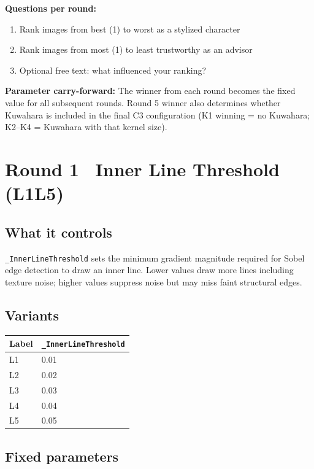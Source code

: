 \documentclass[11pt,a4paper]{article}
\newcommand{\prop}[1]{\texttt{#1}}
\begin{document}
\textbf{Questions per round:}
\begin{enumerate}[nosep]
  \item Rank images from best (1) to worst as a stylized character
  \item Rank images from most (1) to least trustworthy as an advisor
  \item Optional free text: what influenced your ranking?
\end{enumerate}

\textbf{Parameter carry-forward:} The winner from each round becomes the fixed value for all subsequent rounds. Round 5 winner also determines whether Kuwahara is included in the final C3 configuration (K1 winning = no Kuwahara; K2--K4 = Kuwahara with that kernel size).

\bigskip

\section*{Round 1 \textemdash\ Inner Line Threshold (L1\textendash L5)}

\subsection*{What it controls}
\prop{\_InnerLineThreshold} sets the minimum gradient magnitude required for Sobel edge detection to draw an inner line. Lower values draw more lines including texture noise; higher values suppress noise but may miss faint structural edges.

\subsection*{Variants}

\begin{tabular}{ll}
\toprule
\textbf{Label} & \prop{\_InnerLineThreshold} \\
\midrule
L1 & 0.01 \\
L2 & 0.02 \\
L3 & 0.03 \\
L4 & 0.04 \\
L5 & 0.05 \\
\bottomrule
\end{tabular}

\subsection*{Fixed parameters}
\end{document}
